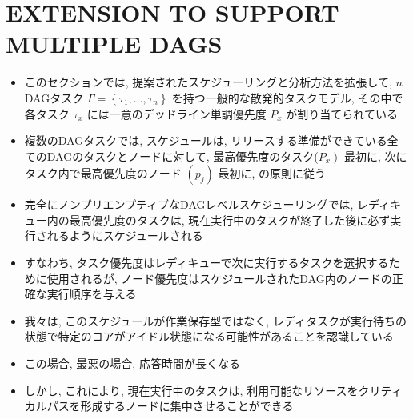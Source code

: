 
\section{EXTENSION TO SUPPORT MULTIPLE DAGS}
\label{sec: EXTENSION TO SUPPORT MULTIPLE DAGS}

\begin{frame}{}
    \begin{itemize}
        \item このセクションでは, 提案されたスケジューリングと分析方法を拡張して, $n$ DAGタスク $\Gamma=\left\{\tau_{1}, \ldots, \tau_{n}\right\}$ を持つ一般的な散発的タスクモデル, その中で各タスク $\tau_{x}$ には一意のデッドライン単調優先度 $P_{x}$ が割り当てられている
        \item 複数のDAGタスクでは, スケジュールは, リリースする準備ができている全てのDAGのタスクとノードに対して, 最高優先度のタスク($\left.P_{x}\right)$ 最初に, 次にタスク内で最高優先度のノード $\left(p_{j}\right)$ 最初に, の原則に従う
    \end{itemize}
\end{frame}

\begin{frame}{}
    \begin{itemize}
        \item 完全にノンプリエンプティブなDAGレベルスケジューリングでは, レディキュー内の最高優先度のタスクは, 現在実行中のタスクが終了した後に必ず実行されるようにスケジュールされる
        \item すなわち, タスク優先度はレディキューで次に実行するタスクを選択するために使用されるが, ノード優先度はスケジュールされたDAG内のノードの正確な実行順序を与える
        \item 我々は, このスケジュールが作業保存型ではなく, レディタスクが実行待ちの状態で特定のコアがアイドル状態になる可能性があることを認識している
        \item この場合, 最悪の場合, 応答時間が長くなる
        \item しかし, これにより, 現在実行中のタスクは, 利用可能なリソースをクリティカルパスを形成するノードに集中させることができる
    \end{itemize}
\end{frame}


